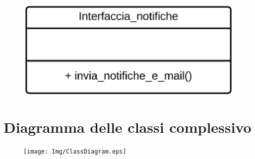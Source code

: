 \begin{figure}[ht]
    \centering
    \includegraphics[scale=0.3]{Img/ClassNotifiche.eps}
\end{figure}

\newpage
\section{Diagramma delle classi complessivo}

\begin{figure}[ht]
    \centering
    \texttt{[image: Img/ClassDiagram.eps]}
\end{figure}